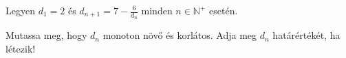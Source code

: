 \documentclass[11pt]{scrartcl}
\begin{document}
Legyen $d_1 = 2$ és \(\displaystyle d_{n + 1} = 7 - \frac{6}{d_n}\) minden
$n \in \mathbb{N}^+$ esetén.

Mutassa meg, hogy $d_n$ monoton növő és korlátos. Adja meg $d_n$
határértékét, ha létezik!
\end{document}
